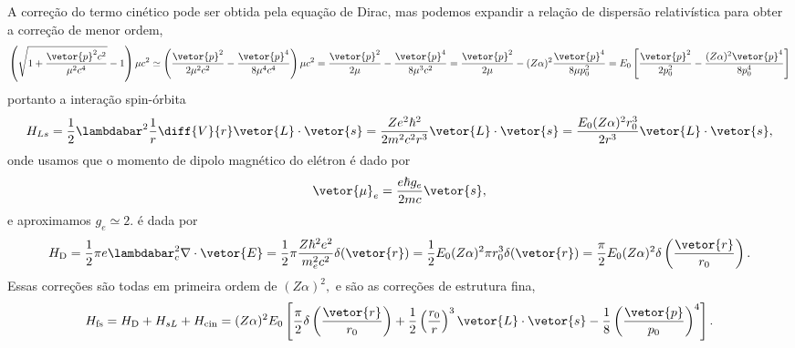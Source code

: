 A correção do termo cinético pode ser obtida pela equação de Dirac, mas podemos expandir a relação de dispersão relativística para obter a correção de menor ordem,
\begin{equation*}
   \left(\sqrt{1 + \frac{\vetor{p}^2c^2}{\mu^2 c^4}} - 1\right)\mu c^2 \simeq \left(\frac{\vetor{p}^2}{2\mu^2 c^2} - \frac{\vetor{p}^4}{8\mu^4 c^4}\right) \mu c^2 = \frac{\vetor{p}^2}{2\mu} - \frac{\vetor{p}^4}{8\mu^3 c^2} = \frac{\vetor{p}^2}{2\mu} - (Z \alpha)^2\frac{\vetor{p}^4}{8\mu p_0^2} = E_0 \left[\frac{\vetor{p}^2}{2p_0^2} - \frac{(Z \alpha)^2 \vetor{p}^4}{8p_0^4}\right]
\end{equation*}
 portanto a interação spin-órbita 
\begin{equation*}
   H_{Ls} = \frac12 \lambdabar^2 \frac{1}{r} \diff{V}{r} \vetor{L} \cdot \vetor{s} = \frac{Z e^2\hbar^2}{2m^2 c^2r^3} \vetor{L} \cdot \vetor{s} = \frac{E_0 (Z \alpha)^2r_0^3}{2r^3}\vetor{L}\cdot\vetor{s},
\end{equation*}
onde usamos que o momento de dipolo magnético do elétron é dado por
\begin{equation*}
   \vetor{\mu}_e = \frac{e \hbar g_e}{2m c} \vetor{s},
\end{equation*}
e aproximamos \(g_e \simeq 2.\)  é dada por
\begin{equation*}
   H_\mathrm{D} = \frac12 \pi e \lambdabar_c^2 \nabla \cdot \vetor{E} = \frac{1}{2} \pi \frac{Z\hbar^2e^2}{m_e^2 c^2} \delta(\vetor{r}) = \frac12 E_0(Z \alpha)^2\pi r_0^3\delta(\vetor{r}) = \frac\pi2 E_0 (Z \alpha)^2 \delta\left(\frac{\vetor{r}}{r_0}\right).
\end{equation*}
Essas correções são todas em primeira ordem de \((Z\alpha)^2,\) e são as correções de estrutura fina,
\begin{equation*}
   H_\mathrm{fs} = H_\mathrm{D} + H_{sL} +  H_\mathrm{cin} = (Z \alpha)^2E_0 \left[\frac{\pi}{2} \delta\left(\frac{\vetor{r}}{r_0}\right) + \frac12\left(\frac{r_0}{r}\right)^3 \vetor{L}\cdot\vetor{s} - \frac{1}{8} \left(\frac{\vetor{p}}{p_0}\right)^4\right].
\end{equation*}

